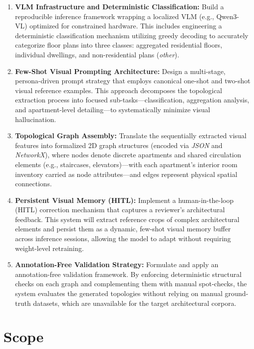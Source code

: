 \documentclass[12pt,a4paper,openright]{report}
\begin{document}
\begin{enumerate}
    \item \textbf{VLM Infrastructure and Deterministic Classification:} Build a reproducible inference framework wrapping a localized VLM (e.g., Qwen3-VL) optimized for constrained hardware. This includes engineering a deterministic classification mechanism utilizing greedy decoding to accurately categorize floor plans into three classes: aggregated residential floors, individual dwellings, and non-residential plans (\textit{other}).
    
    \item \textbf{Few-Shot Visual Prompting Architecture:} Design a multi-stage, persona-driven prompt strategy that employs canonical one-shot and two-shot visual reference examples. This approach decomposes the topological extraction process into focused sub-tasks---classification, aggregation analysis, and apartment-level detailing---to systematically minimize visual hallucination.
    
    \item \textbf{Topological Graph Assembly:} Translate the sequentially extracted visual features into formalized 2D graph structures (encoded via \textit{JSON} and \textit{NetworkX}), where nodes denote discrete apartments and shared circulation elements (e.g., staircases, elevators)---with each apartment's interior room inventory carried as node attributes---and edges represent physical spatial connections.
    
    \item \textbf{Persistent Visual Memory (HITL):} Implement a human-in-the-loop (HITL) correction mechanism that captures a reviewer's architectural feedback. This system will extract reference crops of complex architectural elements and persist them as a dynamic, few-shot visual memory buffer across inference sessions, allowing the model to adapt without requiring weight-level retraining.
    
    \item \textbf{Annotation-Free Validation Strategy:} Formulate and apply an annotation-free validation framework. By enforcing deterministic structural checks on each graph and complementing them with manual spot-checks, the system evaluates the generated topologies without relying on manual ground-truth datasets, which are unavailable for the target architectural corpora.
\end{enumerate}


\section{Scope}
\end{document}
